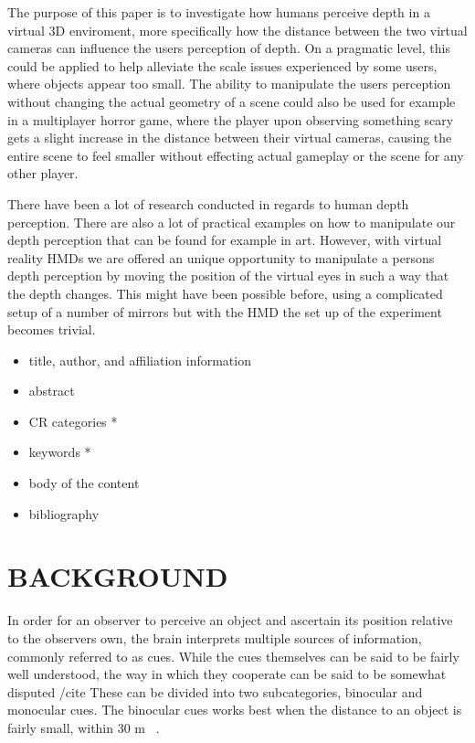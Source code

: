 \documentclass[tog]{acmsiggraph}
\begin{document}
The purpose of this paper is to investigate how humans perceive depth in a virtual 3D enviroment, more specifically how the distance between the two virtual cameras can influence the users perception of depth. On a pragmatic level, this could be applied to help alleviate the scale issues experienced by some users, where objects appear too small. The ability to manipulate the users perception without changing the actual geometry of a scene could also be used for example in a multiplayer horror game, where the player upon observing something scary gets a slight increase in the distance between their virtual cameras, causing the entire scene to feel smaller without effecting actual gameplay or the scene for any other player.    

There have been a lot of research conducted in regards to human depth perception. There are also a lot of practical examples on how to manipulate our depth perception that can be found for example in art. However, with virtual reality HMDs we are offered an unique opportunity to manipulate a persons depth perception by moving the position of the virtual eyes in such a way that the depth changes. This might have been possible before, using a complicated setup of a number of mirrors but with the HMD the set up of the experiment becomes trivial.  


\begin{itemize}
\item title, author, and affiliation information
\item abstract
\item CR categories *
\item keywords *
\item body of the content
\item bibliography
\end{itemize}



\section{BACKGROUND}

In order for an observer to perceive an object and ascertain its position relative to the observers own, the brain interprets multiple sources of information, commonly referred to as cues. 
While the cues themselves can be said to be fairly well understood, the way in which they cooperate can be said to be somewhat disputed /cite {} 
These can be divided into two subcategories, binocular and monocular cues. The binocular cues works best when the distance to an object is fairly small, within 30 m ~\cite {Palvqvist:2013:DPDS}.
\end{document}

